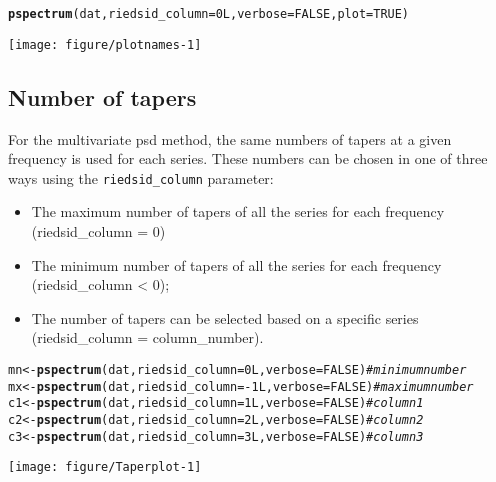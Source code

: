 \documentclass[11pt]{article}\usepackage[]{graphicx}\usepackage[]{color}
\makeatletter
\def\maxwidth{ %
  \ifdim\Gin@nat@width>\linewidth
    \linewidth
  \else
    \Gin@nat@width
  \fi
}
\newcommand{\hlnum}[1]{\textcolor[rgb]{0.686,0.059,0.569}{#1}}%
\newcommand{\hlcom}[1]{\textcolor[rgb]{0.678,0.584,0.686}{\textit{#1}}}%
\newcommand{\hlopt}[1]{\textcolor[rgb]{0,0,0}{#1}}%
\newcommand{\hlstd}[1]{\textcolor[rgb]{0.345,0.345,0.345}{#1}}%
\newcommand{\hlkwb}[1]{\textcolor[rgb]{0.69,0.353,0.396}{#1}}%
\newcommand{\hlkwc}[1]{\textcolor[rgb]{0.333,0.667,0.333}{#1}}%
\newcommand{\hlkwd}[1]{\textcolor[rgb]{0.737,0.353,0.396}{\textbf{#1}}}%
\newenvironment{kframe}{%
 \def\at@end@of@kframe{}%
 \ifinner\ifhmode%
  \def\at@end@of@kframe{\end{minipage}}%
  \begin{minipage}{\columnwidth}%
 \fi\fi%
 \def\FrameCommand##1{\hskip\@totalleftmargin \hskip-\fboxsep
 \colorbox{shadecolor}{##1}\hskip-\fboxsep
     \hskip-\linewidth \hskip-\@totalleftmargin \hskip\columnwidth}%
 \MakeFramed {\advance\hsize-\width
   \@totalleftmargin\z@ \linewidth\hsize
   \@setminipage}}%
 {\par\unskip\endMakeFramed%
 \at@end@of@kframe}
\newenvironment{knitrout}{}{} %
\newcommand{\Rcmd}[1]{\texttt{#1}}
\makeatother
\begin{document}
\begin{knitrout}
\color{fgcolor}\begin{kframe}
\begin{alltt}
\hlkwd{pspectrum}\hlstd{(dat,} \hlkwc{riedsid_column}\hlstd{=} \hlnum{0L}\hlstd{,} \hlkwc{verbose} \hlstd{=} \hlnum{FALSE}\hlstd{,} \hlkwc{plot} \hlstd{=} \hlnum{TRUE}\hlstd{)}
\end{alltt}
\end{kframe}
\texttt{[image: figure/plotnames-1]} 
\end{knitrout}




\newpage

\subsection{Number of tapers}

For the multivariate psd method, the same numbers of tapers at a given frequency is used for each series. These numbers can be chosen in one of three ways using the \Rcmd{riedsid\_column} parameter:

\begin{itemize}
\item The maximum number of tapers of all the series for each frequency (riedsid\_column = 0)
\item The minimum number of tapers of all the series for each frequency (riedsid\_column < 0);
\item The number of tapers can be selected based on a specific series (riedsid\_column = column\_number).
\end{itemize}

\begin{knitrout}
\color{fgcolor}\begin{kframe}
\begin{alltt}
\hlstd{mn} \hlkwb{<-} \hlkwd{pspectrum}\hlstd{(dat,} \hlkwc{riedsid_column}\hlstd{=} \hlnum{0L}\hlstd{,} \hlkwc{verbose} \hlstd{=} \hlnum{FALSE}\hlstd{)}   \hlcom{# minimum number }
\hlstd{mx} \hlkwb{<-} \hlkwd{pspectrum}\hlstd{(dat,} \hlkwc{riedsid_column}\hlstd{=}\hlopt{-}\hlnum{1L}\hlstd{,} \hlkwc{verbose} \hlstd{=} \hlnum{FALSE}\hlstd{)}   \hlcom{# maximum number}
\hlstd{c1} \hlkwb{<-} \hlkwd{pspectrum}\hlstd{(dat,} \hlkwc{riedsid_column}\hlstd{=} \hlnum{1L}\hlstd{,} \hlkwc{verbose} \hlstd{=} \hlnum{FALSE}\hlstd{)}   \hlcom{# column 1}
\hlstd{c2} \hlkwb{<-} \hlkwd{pspectrum}\hlstd{(dat,} \hlkwc{riedsid_column}\hlstd{=} \hlnum{2L}\hlstd{,} \hlkwc{verbose} \hlstd{=} \hlnum{FALSE}\hlstd{)}   \hlcom{# column 2}
\hlstd{c3} \hlkwb{<-} \hlkwd{pspectrum}\hlstd{(dat,} \hlkwc{riedsid_column}\hlstd{=} \hlnum{3L}\hlstd{,} \hlkwc{verbose} \hlstd{=} \hlnum{FALSE}\hlstd{)}   \hlcom{# column 3}
\end{alltt}
\end{kframe}
\end{knitrout}
\begin{knitrout}
\color{fgcolor}
\texttt{[image: figure/Taperplot-1]} 
\end{knitrout}
\end{document}
